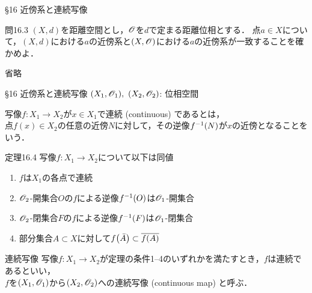 \documentclass[uplatex,a4paper,dvipdfmx,aspectratio=169,11pt]{beamer}
\begin{document}
\begin{frame}[fragile]{\S 16 近傍系と連続写像}
    \begin{exampleblock}{問16.3}
        $(X, d)$を距離空間とし，$\mathscr{O}$を$d$で定まる距離位相とする．
        点$a \in X$について，$(X, d)$における$a$の近傍系と$(X, \mathscr{O})$における$a$の近傍系が一致することを確かめよ．
    \end{exampleblock}
     \quad 省略
\end{frame}

\begin{frame}[fragile]{\S 16 近傍系と連続写像}
    $(X_1, \mathscr{O}_1),\ (X_2, \mathscr{O}_2)$: 位相空間

    \medskip{}
    写像$f \colon X_1 \to X_2$が$x \in X_1$で\alert{連続} (continuous) であるとは，\\
    点$f(x) \in X_2$の任意の近傍$N$に対して，その逆像$f^{\mathrm{-1}}(N)$が$x$の近傍となることをいう．
    \begin{block}{定理16.4}
        写像$f \colon X_1 \to X_2$について以下は同値
        \begin{enumerate}
            \item $f$は$X_1$の各点で連続
            \item $\mathscr{O}_2$-開集合$O$の$f$による逆像$f^{\mathrm{-1}}(O)$は$\mathscr{O}_1$-開集合
            \item $\mathscr{O}_2$-閉集合$F$の$f$による逆像$f^{\mathrm{-1}}(F)$は$\mathscr{O}_1$-閉集合
            \item 部分集合$A \subset X$に対して$f \qty(\bar A) \subset \overline{f(A)}$
        \end{enumerate}
    \end{block}

    \vspace{-0.5em}
    \begin{block}{連続写像}
        写像$f \colon X_1 \to X_2$が定理の条件1--4のいずれかを満たすとき，$f$は連続であるといい，\\$f$を$(X_1, \mathscr{O}_1)$から$(X_2, \mathscr{O}_2)$への\alert{連続写像} (continuous map) と呼ぶ．
    \end{block}
\end{frame}
\end{document}
